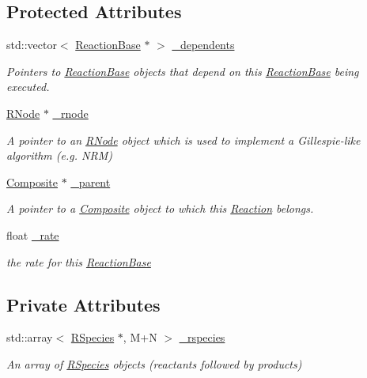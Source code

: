 \subsection*{Protected Attributes}
\begin{DoxyCompactItemize}
\item 
std\-::vector$<$ \hyperlink{classchem_1_1ReactionBase}{Reaction\-Base} $\ast$ $>$ \hyperlink{classchem_1_1ReactionBase_a04cda0098d19b2b4a68a6c413c97ed96}{\-\_\-dependents}
\begin{DoxyCompactList}\small\item\em Pointers to \hyperlink{classchem_1_1ReactionBase}{Reaction\-Base} objects that depend on this \hyperlink{classchem_1_1ReactionBase}{Reaction\-Base} being executed. \end{DoxyCompactList}\item 
\hyperlink{classchem_1_1RNode}{R\-Node} $\ast$ \hyperlink{classchem_1_1ReactionBase_aedaf23c8b9f80598fc68f715309a6aa3}{\-\_\-rnode}
\begin{DoxyCompactList}\small\item\em A pointer to an \hyperlink{classchem_1_1RNode}{R\-Node} object which is used to implement a Gillespie-\/like algorithm (e.\-g. N\-R\-M) \end{DoxyCompactList}\item 
\hyperlink{classchem_1_1Composite}{Composite} $\ast$ \hyperlink{classchem_1_1ReactionBase_a662547106ad4d617495099e9fd85cc06}{\-\_\-parent}
\begin{DoxyCompactList}\small\item\em A pointer to a \hyperlink{classchem_1_1Composite}{Composite} object to which this \hyperlink{classchem_1_1Reaction}{Reaction} belongs. \end{DoxyCompactList}\item 
float \hyperlink{classchem_1_1ReactionBase_a787107879dc2a24b789997bac1eb1634}{\-\_\-rate}
\begin{DoxyCompactList}\small\item\em the rate for this \hyperlink{classchem_1_1ReactionBase}{Reaction\-Base} \end{DoxyCompactList}\end{DoxyCompactItemize}
\subsection*{Private Attributes}
\begin{DoxyCompactItemize}
\item 
std\-::array$<$ \hyperlink{classchem_1_1RSpecies}{R\-Species} $\ast$, M+N $>$ \hyperlink{classchem_1_1Reaction_a42e73865e61bfb5b03a4639b571e5d72}{\-\_\-rspecies}
\begin{DoxyCompactList}\small\item\em An array of \hyperlink{classchem_1_1RSpecies}{R\-Species} objects (reactants followed by products) \end{DoxyCompactList}\end{DoxyCompactItemize}
